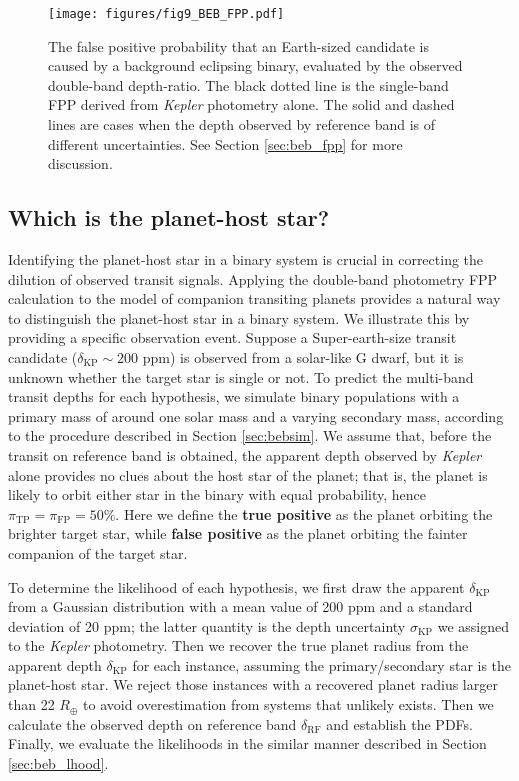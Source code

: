 \documentclass{aastex63}
\begin{document}
\begin{figure}[ht] 
	\centering 
	
	\texttt{[image: figures/fig9\_BEB\_FPP.pdf]}
	\caption{The false positive probability that an Earth-sized candidate is caused by a background eclipsing binary, evaluated by the observed double-band depth-ratio. The black dotted line is the single-band FPP derived from \emph{Kepler} photometry alone. The solid and dashed lines are cases when the depth observed by reference band is of different uncertainties. See Section \ref{sec:beb_fpp} for more discussion.}
	\label{fig:beb_fpp}
\end{figure}

\subsection{Which is the planet-host star?}
\label{sec:ctpfpp}

Identifying the planet-host star in a binary system is crucial in correcting the dilution of observed transit signals. Applying the double-band photometry FPP calculation to the model of companion transiting planets provides a natural way to distinguish the planet-host star in a binary system. We illustrate this by providing a specific observation event. Suppose a Super-earth-size transit candidate ($\delta_\mathrm{KP} \sim 200$ ppm) is observed from a solar-like G dwarf, but it is unknown whether the target star is single or not. To predict the multi-band transit depths for each hypothesis, we simulate binary populations with a primary mass of around one solar mass and a varying secondary mass, according to the procedure described in Section \ref{sec:bebsim}. We assume that, before the transit on reference band is obtained, the apparent depth observed by \emph{Kepler} alone provides no clues about the host star of the planet; that is, the planet is likely to orbit either star in the binary with equal probability, hence $\pi_\mathrm{TP}=\pi_\mathrm{FP}=50\%$. Here we define the \textbf{true positive} as the planet orbiting the brighter target star, while \textbf{false positive} as the planet orbiting the fainter companion of the target star. 

To determine the likelihood of each hypothesis, we first draw the apparent $\delta_\mathrm{KP}$ from a Gaussian distribution with a mean value of 200 ppm and a standard deviation of 20 ppm; the latter quantity is the depth uncertainty $\sigma_\mathrm{KP}$ we assigned to the \emph{Kepler} photometry. Then we recover the true planet radius from the apparent depth $\delta_\mathrm{KP}$ for each instance, assuming the primary/secondary star is the planet-host star. We reject those instances with a recovered planet radius larger than 22 $R_\oplus$ to avoid overestimation from systems that unlikely exists. Then we calculate the observed depth on reference band $\delta_\mathrm{RF}$ and establish the PDFs. Finally, we evaluate the likelihoods in the similar manner described in Section \ref{sec:beb_lhood}.
\end{document}
